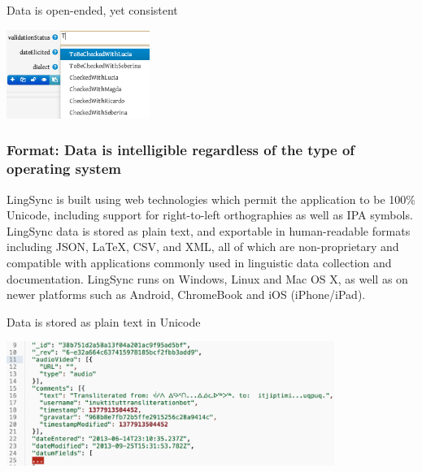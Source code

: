 \documentclass[letterpaper, 12pt, dvips]{mitwpl}
\begin{document}
\begin{exe} 
\ex Data is open-ended, yet consistent

 \centering
    \includegraphics[width=0.35\textwidth]{typeaheadForPreviousCategories}

\label{ex:consistent}
\end{exe}

\subsubsection{\textbf{Format}: Data is intelligible regardless of the type of operating system}
 
LingSync is built using web technologies which permit the application to be 100\% Unicode, including support for right-to-left orthographies as well as IPA symbols. LingSync data is stored as plain text, and exportable in human-readable formats including JSON, LaTeX, CSV, and XML, all of which are non-proprietary and compatible with applications commonly used in linguistic data collection and documentation. LingSync runs on Windows, Linux and Mac OS X, as well as on newer platforms such as Android, ChromeBook and iOS (iPhone/iPad).

\begin{exe} 
\ex Data is stored as plain text in Unicode

 \centering
    \includegraphics[width=0.8\textwidth]{dataIsPlainTextUnicode}

\label{ex:intelligible}
\end{exe}
\end{document}
